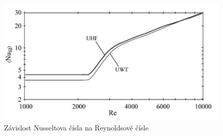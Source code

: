 \begin{figure}[h] \centering \capstart
  \includegraphics[scale=0.3]{figures/nusselt}
  \caption{Závislost Nusseltova čísla na Reynoldsově čísle \cite{Abraham2009}}
  \label{fig:NuReynolds}
\end{figure}

